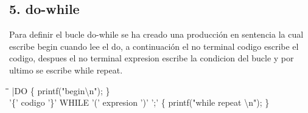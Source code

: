 \documentclass[11pt,spanish]{article}
\begin{document}
        \subsection*{5. do-while}
        Para definir el bucle do-while se ha creado una producción en sentencia la cual escribe begin cuando lee el do, a continuación el no terminal codigo escribe el codigo, despues el no terminal expresion escribe la condicion del bucle y por ultimo se escribe while repeat.
        \begin{tabbing}
        \hspace*{1cm}\=\hspace*{1cm}\= \hspace*{6cm}\=\kill
        \>|DO\>\>											\{ printf("begin\textbackslash n"); \}\\
        \>'\{' codigo '\}' WHILE '(' expresion ')' ';'\> \> \{ printf("while repeat \textbackslash n"); \}\\
        \end{tabbing}
\end{document}
